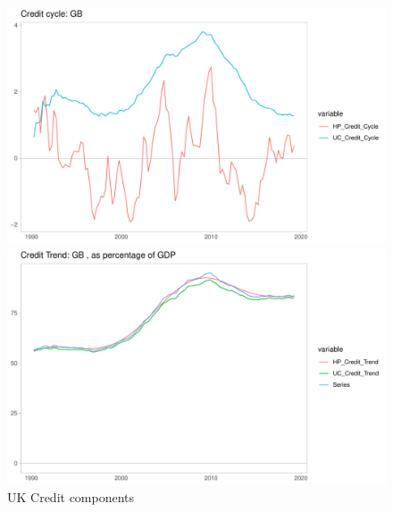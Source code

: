\documentclass[fleqn]{article}
\begin{document}
\begin{outline}[enumerate]
\begin{figure}[h!]
	\caption{UK Credit components}	
	\centerline{\includegraphics[scale=0.7]{../Output/Graphs/Credit_cycle_GB.pdf}}
	\centerline{\includegraphics[scale=0.7]{../Output/Graphs/Credit_trend_GB.pdf}}
\end{figure}


\end{outline}
\end{document}
